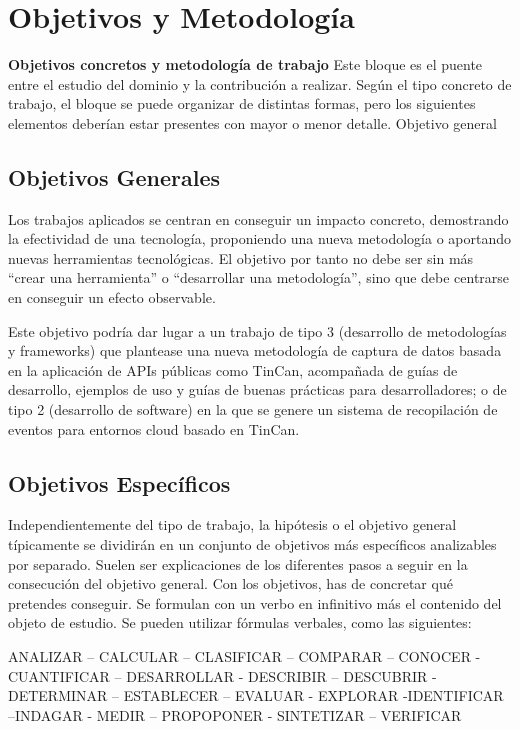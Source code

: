 \chapter{Objetivos y Metodología}\label{chap:objetivos}
\textbf{Objetivos concretos y metodología de trabajo}
Este bloque es el puente entre el estudio del dominio y la contribución a realizar. Según el tipo concreto de trabajo, el bloque se puede organizar de distintas formas, pero los siguientes elementos deberían estar presentes con mayor o menor detalle.
Objetivo general

\section{Objetivos Generales}\label{sec:objgenerales}
Los trabajos aplicados se centran en conseguir un impacto concreto, demostrando la
efectividad de una tecnología, proponiendo una nueva metodología o aportando nuevas
herramientas tecnológicas. El objetivo por tanto no debe ser sin más ``crear una
herramienta'' o ``desarrollar una metodología'', sino que debe centrarse en conseguir un efecto observable.\par
Este objetivo podría dar lugar a un trabajo de tipo 3 (desarrollo de metodologías y
frameworks) que plantease una nueva metodología de captura de datos basada en la
aplicación de APIs públicas como TinCan, acompañada de guías de desarrollo,
ejemplos de uso y guías de buenas prácticas para desarrolladores; o de tipo 2
(desarrollo de software) en la que se genere un sistema de recopilación de eventos para entornos cloud basado en TinCan.


\section{Objetivos Específicos}\label{sec:objespecificos}
Independientemente del tipo de trabajo, la hipótesis o el objetivo general típicamente se dividirán en un conjunto de objetivos más específicos analizables por separado. Suelen ser explicaciones de los diferentes pasos a seguir en la consecución del objetivo general.
Con los objetivos, has de concretar qué pretendes conseguir. Se formulan con un verbo en infinitivo más el contenido del objeto de estudio. Se pueden utilizar fórmulas verbales, como las siguientes:\par
{\centering
ANALIZAR – CALCULAR – CLASIFICAR – COMPARAR – CONOCER -
CUANTIFICAR – DESARROLLAR - DESCRIBIR – DESCUBRIR - DETERMINAR –
ESTABLECER – EVALUAR - EXPLORAR -IDENTIFICAR –INDAGAR - MEDIR –
PROPOPONER - SINTETIZAR – VERIFICAR
}\par

